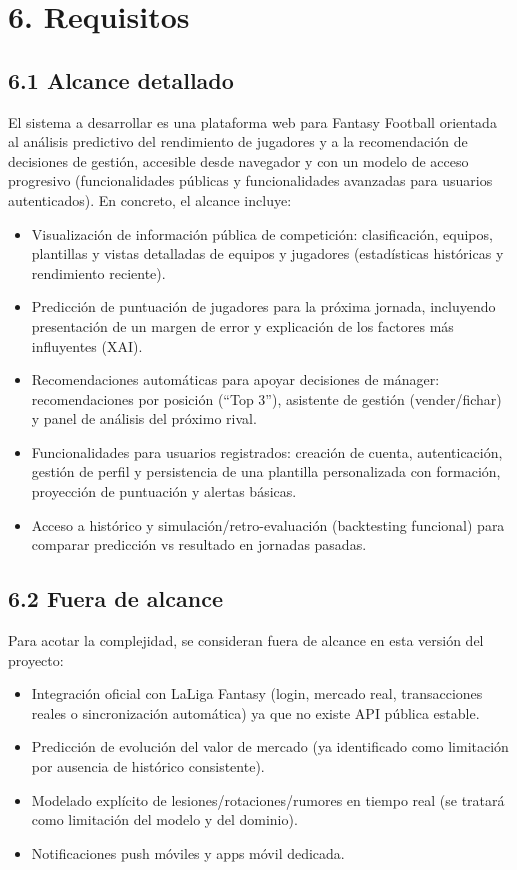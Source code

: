 \section*{6. Requisitos}

\subsection{6.1 Alcance detallado}

El sistema a desarrollar es una plataforma web para Fantasy Football orientada al análisis predictivo 
del rendimiento de jugadores y a la recomendación de decisiones de gestión, accesible desde navegador y 
con un modelo de acceso progresivo (funcionalidades públicas y funcionalidades avanzadas para usuarios 
autenticados). En concreto, el alcance incluye:

\begin{itemize}
  \item Visualización de información pública de competición: clasificación, equipos, plantillas y vistas 
  detalladas de equipos y jugadores (estadísticas históricas y rendimiento reciente).
  \item Predicción de puntuación de jugadores para la próxima jornada, incluyendo presentación de un 
  margen de error y explicación de los factores más influyentes (XAI).
  \item Recomendaciones automáticas para apoyar decisiones de mánager: recomendaciones por posición 
  (``Top 3''), asistente de gestión (vender/fichar) y panel de análisis del próximo rival.
  \item Funcionalidades para usuarios registrados: creación de cuenta, autenticación, gestión de perfil y 
  persistencia de una plantilla personalizada con formación, proyección de puntuación y alertas básicas.
  \item Acceso a histórico y simulación/retro-evaluación (backtesting funcional) para comparar predicción 
  vs resultado en jornadas pasadas.
\end{itemize}

\subsection{6.2 Fuera de alcance}

Para acotar la complejidad, se consideran fuera de alcance en esta versión del proyecto:

\begin{itemize}
  \item Integración oficial con LaLiga Fantasy (login, mercado real, transacciones reales o sincronización 
  automática) ya que no existe API pública estable.
  \item Predicción de evolución del valor de mercado (ya identificado como limitación por ausencia de 
  histórico consistente).
  \item Modelado explícito de lesiones/rotaciones/rumores en tiempo real (se tratará como limitación del 
  modelo y del dominio).
  \item Notificaciones push móviles y apps móvil dedicada.
\end{itemize}

